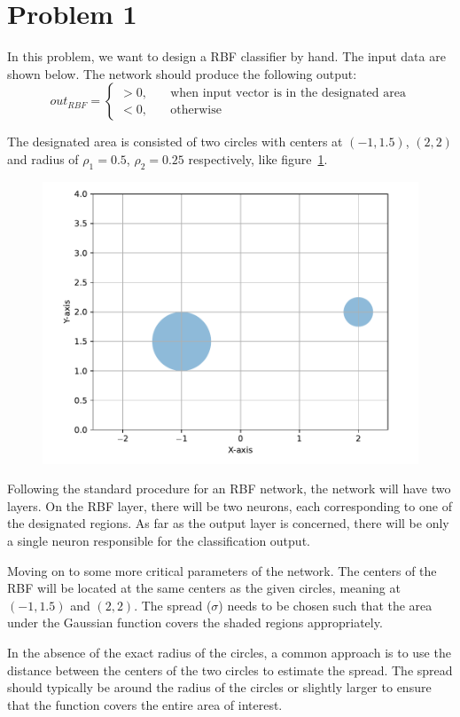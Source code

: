\section{Problem 1}

In this problem, we want to design a RBF classifier by hand. The input data are shown below. The network should produce the following output:
\[
out_{RBF} = \left\{
\begin{array}{cc}
	> 0,& \quad \text{when input vector is in the designated area}\\
	< 0,& \quad \text{otherwise}
\end{array}
\right.
\]

The designated area is consisted of two circles with centers at $\left( -1, 1.5 \right)$, $\left( 2,2 \right)$ and radius of $\rho_1 = 0.5$, $\rho_2 = 0.25$ respectively, like figure~\ref{fig:prob1_circles}.

\begin{figure}[htpb]
	\centering
	\includegraphics[width=0.5\linewidth]{../Problem 1/prob1_designated_area.pdf}
	\caption{}
	\label{fig:prob1_circles}
\end{figure}

Following the standard procedure for an RBF network, the network will have two layers. On the RBF layer, there will be two neurons, each corresponding to one of the designated regions.
As far as the output layer is concerned, there will be only a single neuron responsible for the classification output.

Moving on to some more critical parameters of the network. The centers of the RBF will be located at the same centers as the given circles, meaning at $(-1, 1.5)$ and $(2, 2)$.
The spread ($\sigma$) needs to be chosen such that the area under the Gaussian function covers the shaded regions appropriately. 

In the absence of the exact radius of the circles, a common approach is to use the distance between the centers of the two circles to estimate the spread. The spread should typically be around the radius of the circles or slightly larger to ensure that the function covers the entire area of interest. \\

